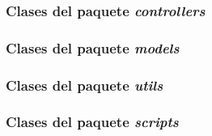 \subsubsection{Clases del paquete \textit{controllers}}
\subsubsection{Clases del paquete \textit{models}}
\subsubsection{Clases del paquete \textit{utils}}
\subsubsection{Clases del paquete \textit{scripts}}


